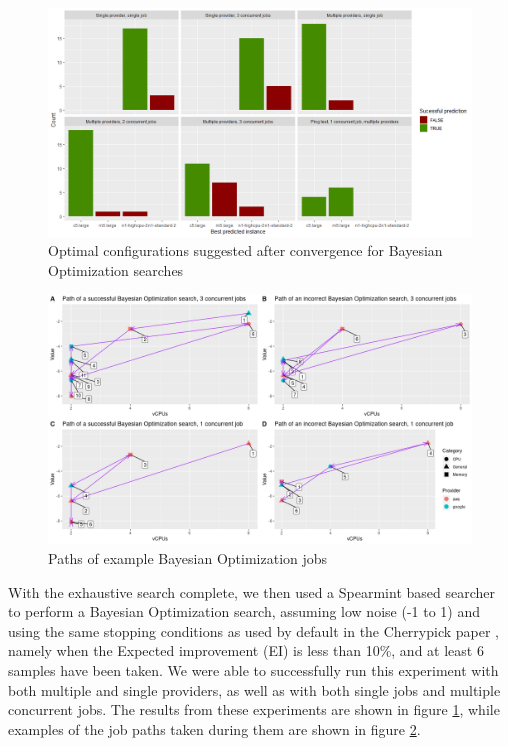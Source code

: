 \documentclass{article}
\begin{document}
\begin{figure}
  \caption{Optimal configurations suggested after convergence for Bayesian Optimization searches}
  \label{fig:bo-results}
  \centering
  \includegraphics[scale=0.5]{bo_results}
\end{figure}
\begin{figure}
	\centering
	\includegraphics[scale=0.4]{paths}
	\caption{Paths of example Bayesian Optimization jobs}
	\label{fig:paths}
\end{figure}

With the exhaustive search complete, we then used a Spearmint based searcher to perform a Bayesian Optimization search, assuming low noise (-1 to 1) and using the same stopping conditions as used by default in the Cherrypick paper \cite{Alipourfard2017}, namely when the Expected improvement (EI) is less than 10\%, and at least 6 samples have been taken. We were able to successfully run this experiment with both multiple and single providers, as well as with both single jobs and multiple concurrent jobs. The results from these experiments are shown in figure \ref{fig:bo-results}, while examples of the job paths taken during them are shown in figure \ref{fig:paths}.
\end{document}
